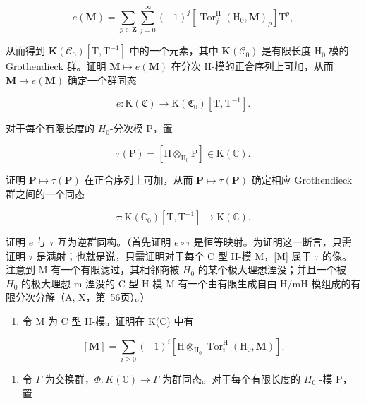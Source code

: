 \[
e (\mathbf {M}) = \sum_ {p \in \mathbf {Z}} \sum_ {j = 0} ^ {\infty} (- 1) ^ {j} [ \operatorname{Tor} _ {j} ^ {\mathrm{H}} (\mathrm{H} _ {0}, \mathbf {M}) _ {p} ] \mathrm{T} ^ {p},
\]

  从而得到 \(\mathbf{K}(\mathcal{C}_{0})[\mathrm{T},\mathrm{T}^{-1}]\) 中的一个元素，其中 \(\mathbf{K}(\mathcal{C}_{0})\) 是有限长度 \(\mathrm{H}_{0}\)-模的 Grothendieck 群。证明 \(\mathbf{M}\mapsto e(\mathbf{M})\) 在分次 H-模的正合序列上可加，从而 \(\mathbf{M}\mapsto e(\mathbf{M})\) 确定一个群同态

\[
e: \mathrm{K} (\mathfrak {C}) \to \mathrm{K} (\mathfrak {C} _ {0}) [ \mathrm{T}, \mathrm{T} ^ {- 1} ].
\]

对于每个有限长度的 \(H_{0}\)-分次模 P，置

\[
\tau (\mathrm{P}) = [ \mathrm{H} \otimes_ {\mathrm{H} _ {0}} \mathrm{P} ] \in \mathrm{K} (\mathbb {C}).
\]

证明 \(\mathbf{P} \mapsto \tau(\mathbf{P})\) 在正合序列上可加，从而 \(\mathbf{P} \mapsto \tau(\mathbf{P})\) 确定相应 Grothendieck 群之间的一个同态

\[
\tau : \mathrm{K} (\mathbb {C} _ {0}) [ \mathrm{T}, \mathrm{T} ^ {- 1} ] \rightarrow \mathrm{K} (\mathbb {C}).
\]

证明 \(e\) 与 \(\tau\) 互为逆群同构。（首先证明 \(e \circ \tau\) 是恒等映射。为证明这一断言，只需证明 \(\tau\) 是满射；也就是说，只需证明对于每个 C 型 H-模 M，{[}M{]} 属于 \(\tau\) 的像。注意到 M 有一个有限滤过，其相邻商被 \(H_0\) 的某个极大理想湮没；并且一个被 \(H_0\) 的极大理想 m 湮没的 C 型 H-模 M 有一个由有限生成自由 H/mH-模组成的有限分次分解（A, X，第~56页）。）

\begin{enumerate}
\def\labelenumi{\alph{enumi})}
\setcounter{enumi}{4}
\tightlist
\item
  令 M 为 C 型 H-模。证明在 K(C) 中有
\end{enumerate}

\[
[ \mathbf {M} ] = \sum_ {i \geqslant 0} (- 1) ^ {i} [ \mathrm{H} \otimes_ {\mathrm{H} _ {0}} \operatorname{Tor} _ {i} ^ {\mathrm{H}} (\mathrm{H} _ {0}, \mathbf {M}) ].
\]

\begin{enumerate}
\def\labelenumi{\alph{enumi})}
\setcounter{enumi}{5}
\tightlist
\item
  令 \(\Gamma\) 为交换群，\(\Phi : K(\mathbb{C}) \to \Gamma\) 为群同态。对于每个有限长度的 \(H_0\) -模 P，置
\end{enumerate}

